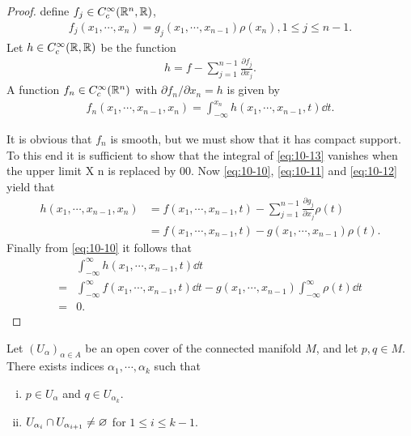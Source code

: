 \begin{proof}
  define $f_j\in C_c^\infty(\mathbb{R}^n, \mathbb{R})$,
  \begin{align}\label{eq:10-11}
    f_j(x_1, \cdots, x_n) = g_j(x_1, \cdots, x_{n-1})\rho(x_n), 1\le j\le n-1.
  \end{align}
  Let $h\in C_c^\infty(\mathbb{R}, \mathbb{R})$ be the function
  \begin{align}\label{eq:10-12}
    h = f - \sum_{j=1}^{n-1}{\frac{\partial f_j}{\partial x_j}}.
  \end{align}
  A function $f_n \in C_c^\infty(\mathbb{R}^n)$ with $\partial f_n/\partial x_n=h$ is given by
  \begin{align}\label{eq:10-13}
    f_n(x_1, \cdots, x_{n-1}, x_n) = \int_{-\infty}^{x_n} h(x_1, \cdots, x_{n-1}, t)\dd t.
  \end{align}

  It is obvious that $f_n$ is smooth, but we must show that it has compact support. To
  this end it is sufficient to show that the integral of \eqref{eq:10-13} vanishes when the upper
  limit X n is replaced by 00. Now \eqref{eq:10-10}, \eqref{eq:10-11} and \eqref{eq:10-12} yield 
  that
  \begin{align*}
    h(x_1, \cdots, x_{n-1}, x_n) 
    & = f(x_1, \cdots, x_{n-1}, t) - \sum_{j=1}^{n-1}{\frac{\partial g_j}{\partial x_j}}\rho(t)\\
    & = f(x_1, \cdots, x_{n-1}, t) - g(x_1, \cdots, x_{n-1})\rho(t).
  \end{align*}
  Finally from \eqref{eq:10-10} it follows that 
  \begin{align*}
    & \int_{-\infty}^\infty h(x_1, \cdots, x_{n-1}, t)\dd t \\
    = & \int_{-\infty}^\infty f(x_1, \cdots, x_{n-1}, t)\dd t 
      - g(x_1, \cdots, x_{n-1})\int_{-\infty}^\infty \rho(t)\dd t\\
    = & 0.
  \end{align*}
\end{proof}

\begin{lemma}\label{lemma:10-16}
  Let $(U_\alpha)_{\alpha\in A}$ be an open cover of the connected manifold $M$, and 
  let $p, q\in M$. There exists indices $\alpha_1, \cdots, \alpha_k$ such that 
  \begin{enumerate}[(i)]
    \item $p\in U_\alpha$ and $q\in U_{\alpha_k}$.
    \item $U_{\alpha_i}\cap U_{\alpha_{i+1}}\neq\varnothing$ for $1\le i\le k-1$.
  \end{enumerate}
\end{lemma}

